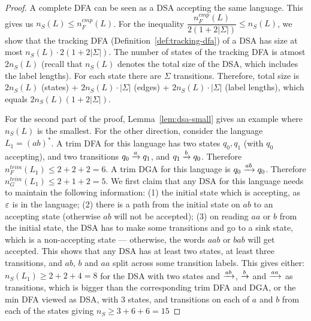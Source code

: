 \begin{proof}
  A complete DFA can be seen as a DSA accepting the same
  language. This gives us $n_S(L) \le n_F^{cmp}(L)$. For the inequality
  $\dfrac{n_F^{cmp}(L)}{2 (1 + 2|\Sigma|)} \le n_S(L)$, we show that the
  tracking DFA (Definition~\ref{def:tracking-dfa}) of a DSA has size
  at most $n_S(L) \cdot 2 (1 + 2|\Sigma|)$. The number of states of the
  tracking DFA is atmost $2 n_S(L)$ (recall that $n_S(L)$ denotes the total size of the DSA, which includes the label lengths). For each state there are $\Sigma$
  transitions. Therefore, total size is $2n_S(L)$ (states) + $2n_S(L) \cdot
 |\Sigma|$ (edges) + $2 n_S(L) \cdot |\Sigma|$ (label lengths), which equals
 $2 n_S(L) (1 + 2 |\Sigma|)$.

 For the second part of the proof, Lemma~\ref{lem:dsa-small} gives an
 example where $n_S(L)$ is the smallest. For the other direction,
 consider the language $L_1 = (ab)^*$. A trim DFA for this language has two
 states $q_0, q_1$ (with $q_0$ accepting), and two transitions $q_0 \xrightarrow{a} q_1$, and $q_1
 \xrightarrow{b} q_0$. Therefore $n_F^{trim}(L_1) \le 2 + 2 + 2 = 6$. A trim DGA
 for this language is $q_0 \xrightarrow{ab} q_0$. Therefore $n_G^{trim}(L_1) \le 2
 + 1 + 2 = 5$. We first claim that any DSA for this language needs to
 maintain the following information: (1) the initial state which is
 accepting, as $\varepsilon$ is in the 
 language; (2) there is a path from the initial state on
 $ab$ to an accepting state (otherwise $ab$ will not be accepted); (3)
 on reading $aa$ or $b$ from the initial state, the DSA has to make 
 some transitions and go to a sink state, which is a non-accepting state
 --- otherwise,  the words $aab$ or $bab$ will get accepted. This shows that any
 DSA has at least two states, at least three transitions, and ${ab}$, $b$ and ${aa}$ split across some transition labels. This gives either: $n_S(L_1) \ge 2 + 2 + 4 = 8$ for the DSA with two states and $\xrightarrow{ab}$, $\xrightarrow{b}$ and $\xrightarrow{aa}$ as transitions, which is bigger than
 the corresponding trim DFA and DGA, or the min DFA viewed as DSA, with 3 states, and transitions on each of $a$ and $b$ from each of the states giving $n_S \ge3+6+6 = 15$
\end{proof}




